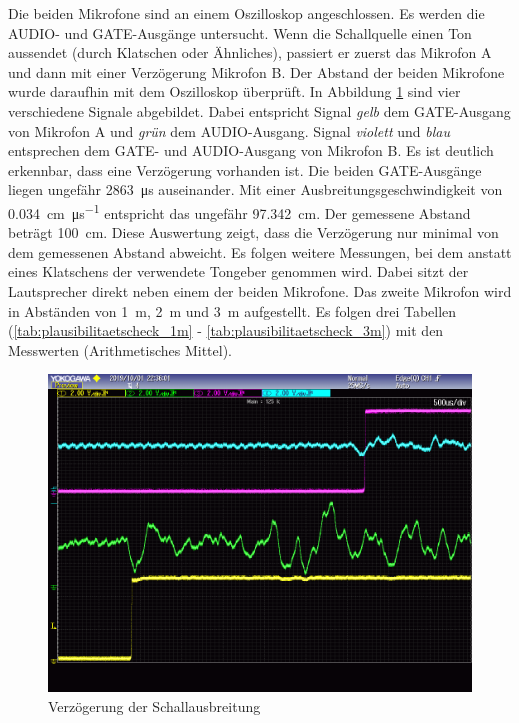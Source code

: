 Die beiden Mikrofone sind an einem Oszilloskop angeschlossen. Es werden die \si{AUDIO}- und \si{GATE}-Ausgänge untersucht. Wenn die Schallquelle einen Ton aussendet (durch Klatschen oder Ähnliches), passiert er zuerst das Mikrofon A und dann mit einer Verzögerung Mikrofon B. Der Abstand der beiden Mikrofone wurde daraufhin mit dem Oszilloskop überprüft. In Abbildung \ref{img:plausibilitaetscheck_oszi} sind vier verschiedene Signale abgebildet. Dabei entspricht Signal \textit{gelb} dem \si{GATE}-Ausgang von Mikrofon A und \textit{grün} dem \si{AUDIO}-Ausgang. Signal \textit{violett} und \textit{blau} entsprechen dem \si{GATE}- und \si{AUDIO}-Ausgang von Mikrofon B. Es ist deutlich erkennbar, dass eine Verzögerung vorhanden ist. Die beiden \si{GATE}-Ausgänge liegen ungefähr \SI{2863}{\micro \second} auseinander. Mit einer Ausbreitungsgeschwindigkeit von \SI{0,034}{\centi\metre\per\micro\second} entspricht das ungefähr \SI{97,342}{\centi\metre}. Der gemessene Abstand beträgt \SI{100}{\centi\metre}. Diese Auswertung zeigt, dass die Verzögerung nur minimal von dem gemessenen Abstand abweicht. Es folgen weitere Messungen, bei dem anstatt eines Klatschens der verwendete Tongeber genommen wird. Dabei sitzt der Lautsprecher direkt neben einem der beiden Mikrofone. Das zweite Mikrofon wird in Abständen von \SI{1}{\metre}, \SI{2}{\metre} und \SI{3}{\metre} aufgestellt. Es folgen drei Tabellen (\ref{tab:plausibilitaetscheck_1m} - \ref{tab:plausibilitaetscheck_3m}) mit den Messwerten (Arithmetisches Mittel).

\begin{figure}[H]
	\centering
	\hspace*{-1.9cm}
	\includegraphics[width=1.2\textwidth]{images/plausibilitaetscheck_oszi.png}
	\caption{Verzögerung der Schallausbreitung}
	\label{img:plausibilitaetscheck_oszi}
\end{figure}

